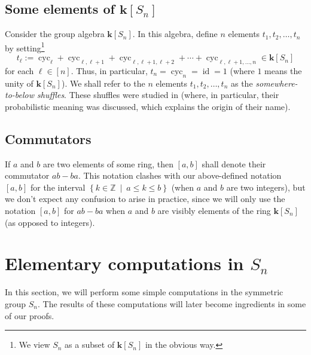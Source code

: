 \documentclass[numbers=enddot,12pt,final,onecolumn,notitlepage]{scrartcl}%
\theoremstyle{definition}
\begin{document}
\subsection{Some elements of $\mathbf{k}\left[  S_{n}\right]  $}

Consider the group algebra $\mathbf{k}\left[  S_{n}\right]  $. In this
algebra, define $n$ elements $t_{1},t_{2},\ldots,t_{n}$ by setting\footnote{We
view $S_{n}$ as a subset of $\mathbf{k}\left[  S_{n}\right]  $ in the obvious
way.}%
\begin{equation}
t_{\ell}:=\operatorname*{cyc}\nolimits_{\ell}+\operatorname*{cyc}%
\nolimits_{\ell,\ell+1}+\operatorname*{cyc}\nolimits_{\ell,\ell+1,\ell
+2}+\cdots+\operatorname*{cyc}\nolimits_{\ell,\ell+1,\ldots,n}\in
\mathbf{k}\left[  S_{n}\right]  \label{eq.def.tl.deftl}%
\end{equation}
for each $\ell\in\left[  n\right]  $. Thus, in particular, $t_{n}%
=\operatorname*{cyc}\nolimits_{n}=\operatorname*{id}=1$ (where $1$ means the
unity of $\mathbf{k}\left[  S_{n}\right]  $). We shall refer to the $n$
elements $t_{1},t_{2},\ldots,t_{n}$ as the \emph{somewhere-to-below shuffles}.
These shuffles were studied in \cite{s2b1} (where, in particular, their
probabilistic meaning was discussed, which explains the origin of their name).

\subsection{Commutators}

If $a$ and $b$ are two elements of some ring, then $\left[  a,b\right]  $
shall denote their commutator $ab-ba$. This notation clashes with our
above-defined notation $\left[  a,b\right]  $ for the interval $\left\{
k\in\mathbb{Z}\ \mid\ a\leq k\leq b\right\}  $ (when $a$ and $b$ are two
integers), but we don't expect any confusion to arise in practice, since we
will only use the notation $\left[  a,b\right]  $ for $ab-ba$ when $a$ and $b$
are visibly elements of the ring $\mathbf{k}\left[  S_{n}\right]  $ (as
opposed to integers).


\section{Elementary computations in $S_{n}$}

In this section, we will perform some simple computations in the symmetric
group $S_{n}$. The results of these computations will later become ingredients
in some of our proofs.
\end{document}
